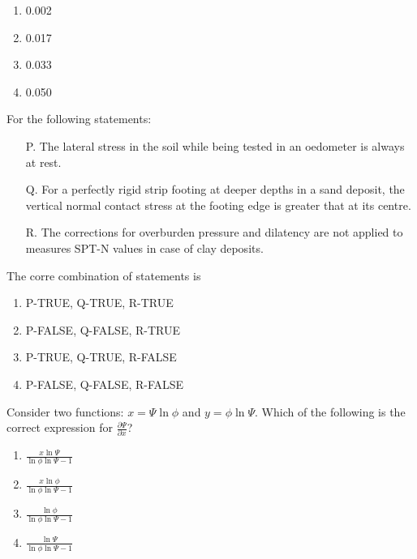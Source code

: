         \hfill{}
        \begin{multicols}{4}
            \begin{enumerate}
                \item 0.002
                    \columnbreak
                \item 0.017
                    \columnbreak
                \item 0.033
                    \columnbreak
                \item 0.050
            \end{enumerate}
        \end{multicols}
    \item For the following statements:
        \begin{enumerate}
            \item[P.] The lateral stress in the soil while being tested in an oedometer is always at rest. 
            \item[Q.] For a perfectly rigid strip footing at deeper depths in a sand deposit, the vertical
                normal contact stress at the footing edge is greater that at its centre.
            \item[R.] The corrections for overburden pressure and dilatency are not applied to measures 
                SPT-N values in case of clay deposits.
        \end{enumerate}
        The corre combination of statements is
        \hfill{}
            \begin{enumerate}
                \item P-TRUE, Q-TRUE, R-TRUE
                \item P-FALSE, Q-FALSE, R-TRUE
                \item P-TRUE, Q-TRUE, R-FALSE
                \item P-FALSE, Q-FALSE, R-FALSE
            \end{enumerate}
    \item Consider two functions: $x = \Psi \ln\phi$ and $y = \phi \ln\Psi$. Which of the following
        is the correct expression for $\frac{\partial \Psi}{\partial x}$?
        \hfill{}
        \begin{multicols}{4}
            \begin{enumerate}
                \item $\frac{x \ln \Psi}{\ln\phi\ln\Psi - 1}$
                    \columnbreak
                \item $\frac{x \ln \phi}{\ln\phi\ln\Psi - 1}$
                    \columnbreak
                \item $\frac{ \ln \phi}{\ln\phi\ln\Psi - 1}$
                    \columnbreak
                \item $\frac{\ln \Psi}{\ln\phi\ln\Psi - 1}$
            \end{enumerate}
        \end{multicols}
